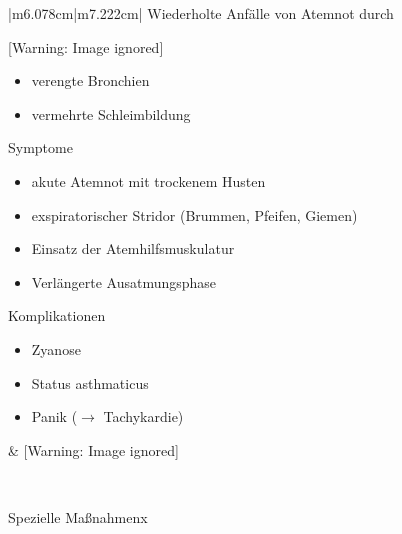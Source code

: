 \documentclass{article}
\begin{document}
\begin{center}
\tablehead{}\begin{supertabular}{|m{6.078cm}|m{7.222cm}|}
\hline
Wiederholte Anf\"alle von Atemnot durch

\begin{center}
 [Warning: Image ignored] %

\end{center}
\begin{itemize}
\item verengte Bronchien

\item vermehrte Schleimbildung

\end{itemize}
Symptome

\begin{itemize}
\item akute Atemnot mit trockenem Husten

\item exspiratorischer Stridor (Brummen, Pfeifen,  Giemen)

\item Einsatz der Atemhilfsmuskulatur

\item Verl\"angerte Ausatmungsphase

\end{itemize}
Komplikationen

\begin{itemize}
\item Zyanose

\item Status asthmaticus

\item Panik (${\rightarrow}$ Tachykardie)

\end{itemize}
 &
  [Warning: Image ignored] %
 

\\\hline
\end{supertabular}
\end{center}
Spezielle Ma{\ss}nahmenx
\end{document}
